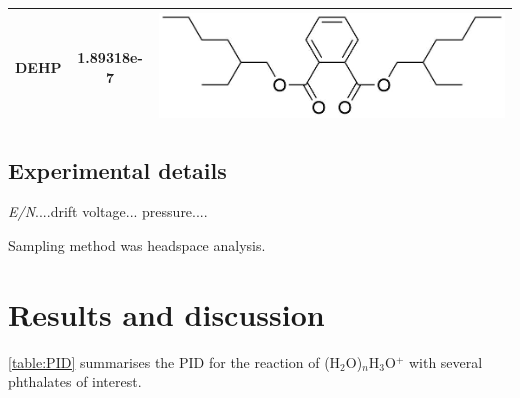 \begin{table}
\begin{tabular}{lcc}
DEHP &  1.89318e-7   &  \begin{minipage}[c]{0.35\linewidth}\centering
\includegraphics[height=0.07\textheight]{pics/PH/DEHP_struct2.png}\end{minipage}\\ 
\bottomrule
\end{tabular}
\label{tab:PH_structs}
\end{table}
































\subsection{Experimental details}

\textit{E/N}....drift voltage...
pressure....

Sampling method was headspace analysis.




















\section{Results and discussion}




\autoref{table:PID} summarises the PID for the reaction of (H$_2$O)$_n$H$_3$O$^+$ with several phthalates of interest.






